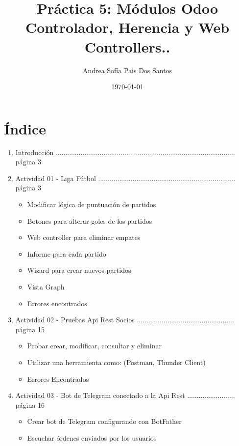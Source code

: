 \documentclass[a4paper,12pt]{article}
\title{Práctica 5: Módulos Odoo Controlador, Herencia y Web Controllers..}
\author{Andrea Sofía Pais Dos Santos}
\date{\today}
\begin{document}
\setlength{\droptitle}{0.4\textheight} 
\maketitle
\thispagestyle{empty}
\newpage 


\vspace{7cm}

\section{Índice}

\begin{enumerate}[start=2]
    \item Introducción  .............................................................................................. página 3
    \item Actividad 01 - Liga Fútbol ........................................................................ página 3
    \begin{itemize}
    \item Modificar lógica de puntuación de partidos
    \item Botones para alterar goles de los partidos
    \item Web controller para eliminar empates
    \item Informe para cada partido
    \item Wizard para crear nuevos partidos
    \item Vista Graph
    \item Errores encontrados
    \end{itemize}
    \item Actividad 02 - Pruebas Api Rest Socios ................................................... página 15
    \begin{itemize}
    \item Probar crear, modificar, consultar y eliminar
    \item Utilizar una herramienta como: (Postman, Thunder Client)
    \item Errores Encontrados
    \end{itemize}
    \item Actividad 03 - Bot de Telegram conectado a la Api Rest ......................... página 16
    \begin{itemize}
    \item Crear bot de Telegram configurando con BotFather
    \item Escuchar órdenes enviados por los usuarios

\end{itemize}
\end{enumerate}
\end{document}

